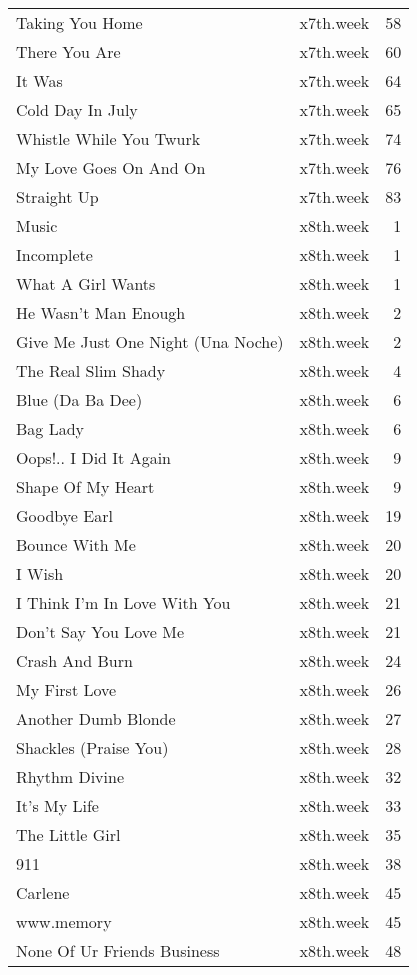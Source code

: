 \begin{table}[ht]
\begin{tabular}{llr}
  Taking You Home & x7th.week &  58 \\ 
  There You Are & x7th.week &  60 \\ 
  It Was & x7th.week &  64 \\ 
  Cold Day In July & x7th.week &  65 \\ 
  Whistle While You Twurk & x7th.week &  74 \\ 
  My Love Goes On And On & x7th.week &  76 \\ 
  Straight Up & x7th.week &  83 \\ 
  Music & x8th.week &   1 \\ 
  Incomplete & x8th.week &   1 \\ 
  What A Girl Wants & x8th.week &   1 \\ 
  He Wasn't Man Enough & x8th.week &   2 \\ 
  Give Me Just One Night (Una Noche) & x8th.week &   2 \\ 
  The Real Slim Shady & x8th.week &   4 \\ 
  Blue (Da Ba Dee) & x8th.week &   6 \\ 
  Bag Lady & x8th.week &   6 \\ 
  Oops!.. I Did It Again & x8th.week &   9 \\ 
  Shape Of My Heart & x8th.week &   9 \\ 
  Goodbye Earl & x8th.week &  19 \\ 
  Bounce With Me & x8th.week &  20 \\ 
  I Wish & x8th.week &  20 \\ 
  I Think I'm In Love With You & x8th.week &  21 \\ 
  Don't Say You Love Me & x8th.week &  21 \\ 
  Crash And Burn & x8th.week &  24 \\ 
  My First Love & x8th.week &  26 \\ 
  Another Dumb Blonde & x8th.week &  27 \\ 
  Shackles (Praise You) & x8th.week &  28 \\ 
  Rhythm Divine & x8th.week &  32 \\ 
  It's My Life & x8th.week &  33 \\ 
  The Little Girl & x8th.week &  35 \\ 
  911 & x8th.week &  38 \\ 
  Carlene & x8th.week &  45 \\ 
  www.memory & x8th.week &  45 \\ 
  None Of Ur Friends Business & x8th.week &  48 \\ 

\end{tabular}
\end{table}
